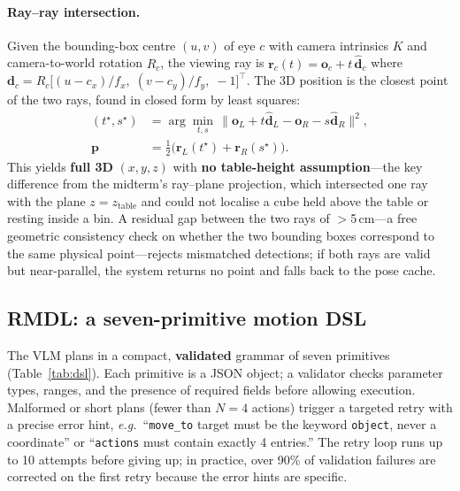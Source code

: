 \documentclass[conference]{IEEEtran}
\newcommand{\eg}{\textit{e.g.}}
\begin{document}
\paragraph{Ray--ray intersection.}
Given the bounding-box centre $(u,v)$ of eye $c$ with camera intrinsics $K$ and camera-to-world rotation $R_c$, the viewing ray is $\mathbf{r}_c(t)=\mathbf{o}_c + t\,\hat{\mathbf{d}}_c$ where $\mathbf{d}_c = R_c\big[(u-c_x)/f_x,\;(v-c_y)/f_y,\;-1\big]^{\!\top}$. The 3D position is the closest point of the two rays, found in closed form by least squares:
\begin{equation}
\label{eq:triang}
\begin{aligned}
(t^\star,s^\star)&=\arg\min_{t,s}\,\big\|\mathbf{o}_L+t\hat{\mathbf{d}}_L-\mathbf{o}_R-s\hat{\mathbf{d}}_R\big\|^2,\\[2pt]
\mathbf{p}&=\tfrac{1}{2}\big(\mathbf{r}_L(t^\star)+\mathbf{r}_R(s^\star)\big).
\end{aligned}
\end{equation}
This yields \textbf{full 3D} $(x,y,z)$ with \textbf{no table-height assumption}---the key difference from the midterm's ray--plane projection, which intersected one ray with the plane $z=z_\text{table}$ and could not localise a cube held above the table or resting inside a bin. A residual gap between the two rays of $>$5\,cm---a free geometric consistency check on whether the two bounding boxes correspond to the same physical point---rejects mismatched detections; if both rays are valid but near-parallel, the system returns no point and falls back to the pose cache.

\subsection{RMDL: a seven-primitive motion DSL}
\label{sec:rmdl}

The VLM plans in a compact, \textbf{validated} grammar of seven primitives (Table~\ref{tab:dsl}). Each primitive is a JSON object; a validator checks parameter types, ranges, and the presence of required fields before allowing execution. Malformed or short plans (fewer than $N=4$ actions) trigger a targeted retry with a precise error hint, \eg\ ``\texttt{move\_to} target must be the keyword \texttt{object}, never a coordinate'' or ``\texttt{actions} must contain exactly 4 entries.'' The retry loop runs up to 10 attempts before giving up; in practice, over 90\% of validation failures are corrected on the first retry because the error hints are specific.
\end{document}
